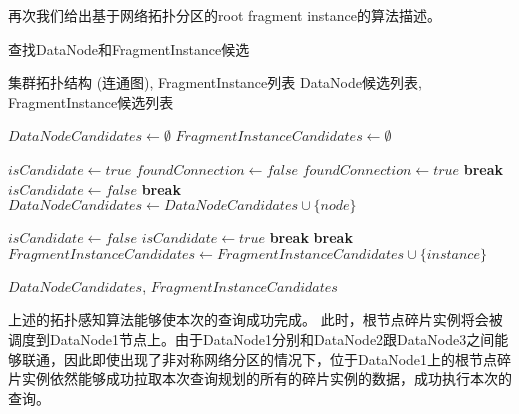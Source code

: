 再次我们给出基于网络拓扑分区的root fragment instance的算法描述。
\begin{algorithm}
  \caption{查找DataNode和FragmentInstance候选}
  \label{alg:find_candidates}
  \begin{algorithmic}
  \REQUIRE 集群拓扑结构 (连通图), FragmentInstance列表
  \ENSURE DataNode候选列表, FragmentInstance候选列表
  
  \STATE $DataNodeCandidates \leftarrow \emptyset$
  \STATE $FragmentInstanceCandidates \leftarrow \emptyset$
  
      \STATE $isCandidate \leftarrow true$
          \STATE $foundConnection \leftarrow false$
                  \STATE $foundConnection \leftarrow true$
                  \STATE \textbf{break} 
              \ENDIF
          \ENDFOR
              \STATE $isCandidate \leftarrow false$
              \STATE \textbf{break} 
          \ENDIF
      \ENDFOR
          \STATE $DataNodeCandidates \leftarrow DataNodeCandidates \cup \{node\}$
      \ENDIF
  \ENDFOR
  
      \STATE $isCandidate \leftarrow false$
                  \STATE $isCandidate \leftarrow true$
                  \STATE \textbf{break} 
              \ENDIF
          \ENDFOR
              \STATE \textbf{break} 
          \ENDIF
      \ENDFOR
          \STATE $FragmentInstanceCandidates \leftarrow FragmentInstanceCandidates \cup \{instance\}$
      \ENDIF
  \ENDFOR
  
  \RETURN $DataNodeCandidates$, $FragmentInstanceCandidates$
  \end{algorithmic}
  \end{algorithm}

上述的拓扑感知算法能够使本次的查询成功完成。
此时，根节点碎片实例将会被调度到DataNode1节点上。由于DataNode1分别和DataNode2跟DataNode3之间能够联通，因此即使出现了非对称网络分区的情况下，位于DataNode1上的根节点碎片实例依然能够成功拉取本次查询规划的所有的碎片实例的数据，成功执行本次的查询。


